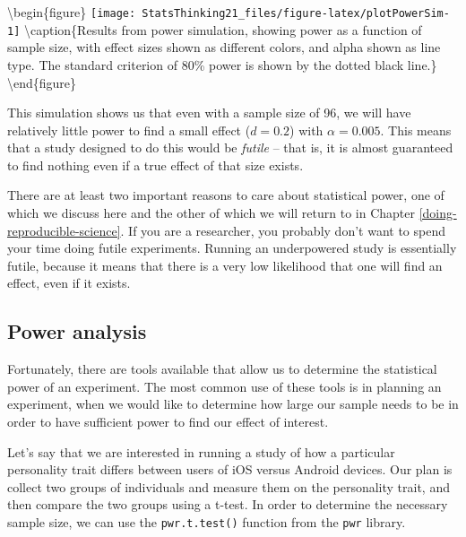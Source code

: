 \documentclass[]{book}
\newenvironment{Shaded}{\begin{snugshade}}{\end{snugshade}}
\newcommand{\KeywordTok}[1]{\textcolor[rgb]{0.13,0.29,0.53}{\textbf{#1}}}
\newcommand{\StringTok}[1]{\textcolor[rgb]{0.31,0.60,0.02}{#1}}
\newcommand{\CommentTok}[1]{\textcolor[rgb]{0.56,0.35,0.01}{\textit{#1}}}
\newcommand{\OperatorTok}[1]{\textcolor[rgb]{0.81,0.36,0.00}{\textbf{#1}}}
\newcommand{\NormalTok}[1]{#1}
\theoremstyle{definition}
\theoremstyle{definition}
\theoremstyle{definition}
\theoremstyle{remark}
\begin{document}
\begin{Shaded}
\begin{Highlighting}[]
{{\CommentTok{# run the simulation}
\NormalTok{powerSimResults <-}\StringTok{ }\NormalTok{powerDf }\OperatorTok{%>%}
\StringTok{  }\KeywordTok{do}\NormalTok{(}\KeywordTok{runPowerSim}\NormalTok{(.))}
\end{Highlighting}
\end{Shaded}

\textbackslash{}begin\{figure\}
\texttt{[image: StatsThinking21\_files/figure-latex/plotPowerSim-1]}
\textbackslash{}caption\{Results from power simulation, showing power as
a function of sample size, with effect sizes shown as different colors,
and alpha shown as line type. The standard criterion of 80\% power is
shown by the dotted black line.\}\label{fig:plotPowerSim}
\textbackslash{}end\{figure\}

This simulation shows us that even with a sample size of 96, we will
have relatively little power to find a small effect (\(d = 0.2\)) with
\(\alpha = 0.005\). This means that a study designed to do this would be
\emph{futile} -- that is, it is almost guaranteed to find nothing even
if a true effect of that size exists.

There are at least two important reasons to care about statistical
power, one of which we discuss here and the other of which we will
return to in Chapter \ref{doing-reproducible-science}. If you are a
researcher, you probably don't want to spend your time doing futile
experiments. Running an underpowered study is essentially futile,
because it means that there is a very low likelihood that one will find
an effect, even if it exists.

\subsection{Power analysis}\label{power-analysis}

Fortunately, there are tools available that allow us to determine the
statistical power of an experiment. The most common use of these tools
is in planning an experiment, when we would like to determine how large
our sample needs to be in order to have sufficient power to find our
effect of interest.

Let's say that we are interested in running a study of how a particular
personality trait differs between users of iOS versus Android devices.
Our plan is collect two groups of individuals and measure them on the
personality trait, and then compare the two groups using a t-test. In
order to determine the necessary sample size, we can use the
\texttt{pwr.t.test()} function from the \texttt{pwr} library.
\end{document}
